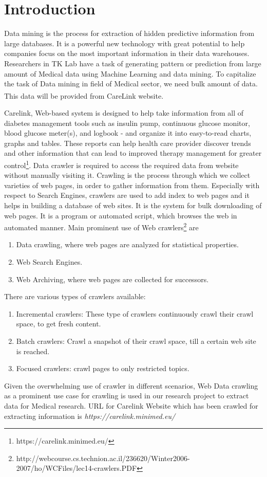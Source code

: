 \documentclass[article,type=msc,colorback,accentcolor=tud9c,twoside,11pt]{tudthesis}
\begin{document}
\clearpage
{}
\section{Introduction}
Data mining is the process for extraction of hidden predictive information from large databases. It is a powerful new technology with great potential to help companies focus on the most important information in their data warehouses. Researchers in TK Lab have a task of generating pattern or prediction from large amount of Medical data using Machine Learning and data mining. To capitalize the task of Data mining in field of Medical sector, we need bulk amount of data. This data will be provided from CareLink\textsuperscript{\textregistered} website. 

Carelink, Web-based system is designed to help take information from all of diabetes management tools such as insulin pump, continuous glucose monitor, blood glucose meter(s), and logbook - and organize it into easy-to-read charts, graphs and tables. These reports can help health care provider discover trends and other information that can lead to improved therapy management for greater control\footnote{https://carelink.minimed.eu/}.
Data crawler is required to access the required data from website without manually visiting it. Crawling is the process through which we collect varieties of web pages, in order to gather information from them. Especially with respect to Search Engines, crawlers are used to add index to web pages and it helps in building a database of web sites. It is the system for bulk downloading of web pages. It is a program or automated script, which browses the web in automated manner. Main prominent use of Web crawlers\footnote{http://webcourse.cs.technion.ac.il/236620/Winter2006-2007/ho/WCFiles/lec14-crawlers.PDF} are
\begin{enumerate}
\item	Data crawling, where web pages are analyzed for statistical properties.
\item	Web Search Engines.
\item	Web Archiving, where web pages are collected for successors.
\end{enumerate}
There are various types of crawlers available:
\begin{enumerate}
\item	Incremental crawlers: These type of crawlers continuously crawl their crawl space, to get fresh content.
\item	Batch crawlers: Crawl a snapshot of their crawl space, till a certain web site is reached.
\item	Focused crawlers: crawl pages to only restricted topics.
\end{enumerate}
Given the overwhelming use of crawler in different scenarios, Web Data crawling as a prominent use case for crawling is used in our research project to extract data for Medical research. URL for Carelink Website which has been crawled for extracting information is \textit{https://carelink.minimed.eu/}
\end{document}
